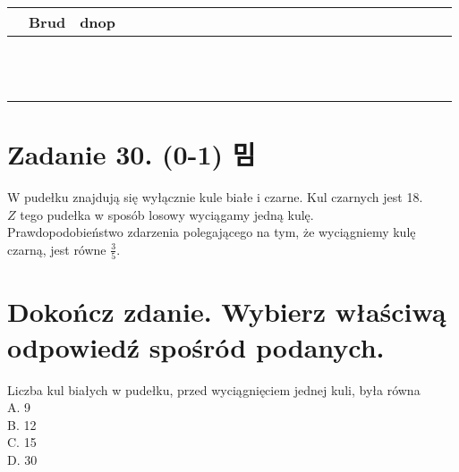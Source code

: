 \documentclass[10pt]{article}
\begin{document}
\begin{center}
\begin{tabular}{|c|c|c|c|c|c|c|c|c|c|c|c|c|c|c|c|c|c|c|c|c|c|c|c|c|c|}
\hline
 & Brud & dnop &  &  &  &  &  &  &  &  &  &  &  &  &  &  &  &  &  &  &  &  &  &  &  \\
\hline
 &  &  &  &  &  &  &  &  &  &  &  &  &  &  &  &  &  &  &  &  &  &  &  &  &  \\
\hline
 &  &  &  &  &  &  &  &  &  &  &  &  &  &  &  &  &  &  &  &  &  &  &  &  &  \\
\hline
 &  &  &  &  &  &  &  &  &  &  &  &  &  &  &  &  &  &  &  &  &  &  &  &  &  \\
\hline
 &  &  &  &  &  &  &  &  &  &  &  &  &  &  &  &  &  &  &  &  &  &  &  &  &  \\
\hline
 &  &  &  &  &  &  &  &  &  &  &  &  &  &  &  &  &  &  &  &  &  &  &  &  &  \\
\hline
 &  &  &  &  &  &  &  &  &  &  &  &  &  &  &  &  &  &  &  &  &  &  &  &  &  \\
\hline
 &  &  &  &  &  &  &  &  &  &  &  &  &  &  &  &  &  &  &  &  &  &  &  &  &  \\
\hline
 &  &  &  &  &  &  &  &  &  &  &  &  &  &  &  &  &  &  &  &  &  &  &  &  &  \\
\hline
 &  &  &  &  &  &  &  &  &  &  &  &  &  &  &  &  &  &  &  &  &  &  &  &  &  \\
\hline
 &  &  &  &  &  &  &  &  &  &  &  &  &  &  &  &  &  &  &  &  &  &  &  &  &  \\
\hline
 &  &  &  &  &  &  &  &  &  &  &  &  &  &  &  &  &  &  &  &  &  &  &  &  &  \\
\hline
 &  &  &  &  &  &  &  &  &  &  &  &  &  &  &  &  &  &  &  &  &  &  &  &  &  \\
\hline
\end{tabular}
\end{center}

\section*{Zadanie 30. (0-1) 밈}
W pudełku znajdują się wyłącznie kule białe i czarne. Kul czarnych jest 18.\\
\(Z\) tego pudełka w sposób losowy wyciągamy jedną kulę.\\
Prawdopodobieństwo zdarzenia polegającego na tym, że wyciągniemy kulę czarną, jest równe \(\frac{3}{5}\).

\section*{Dokończ zdanie. Wybierz właściwą odpowiedź spośród podanych.}
Liczba kul białych w pudełku, przed wyciągnięciem jednej kuli, była równa\\
A. 9\\
B. 12\\
C. 15\\
D. 30
\end{document}
